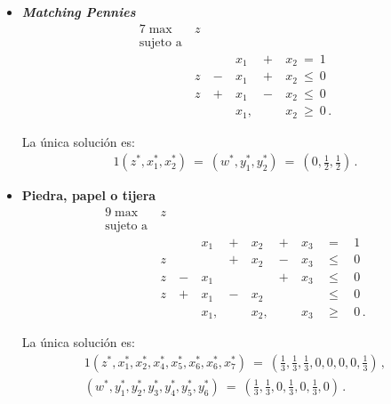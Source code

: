 \begin{itemize}

\item \textbf{\textit{Matching Pennies}}
\begin{alignat}{7}
\label{apex:eq:pl-matching-pennies}
\max\ & z & & & &\\ \nonumber
\text{sujeto a}\ & & & & &\\ \nonumber
    &    &    & x_1\ & +\ & x_2\  =\    1 \\ \nonumber
    & z\ & -\ & x_1\ & +\ & x_2\  \leq\ 0 \\ \nonumber
    & z\ & +\ & x_1\ & -\ & x_2\  \leq\ 0 \\ \nonumber
    &    &    & x_1, &    & x_2\ \geq\ 0 \,. \nonumber
\end{alignat}

La única solución es:
\begin{alignat}{1}
(z^*, x_1^*, x_2^*)\ =\ (w^*, y^*_1, y^*_2)\ =\ \left(0, \frac{1}{2}, \frac{1}{2} \right) \,.
\end{alignat}

\item \textbf{Piedra, papel o tijera}
\begin{alignat}{9}
\label{apex:eq:pl-RPS}
\max\  & z\ &  & & & & & \\ \nonumber
\text{sujeto a}\ & & & & & & & \\  \nonumber 
&    &    & x_1\ & +\ & x_2\ & +\ & x_3\ & \ =\     & \ 1 \\ \nonumber
& z\ &    &      & +\ & x_2\ & -\ & x_3\ & \ \leq\  & \ 0 \\ \nonumber
& z\ & -\ & x_1\ &    &      & +\ & x_3\ & \ \leq\  & \ 0 \\ \nonumber
& z\ & +\ & x_1\ & -\ & x_2\ &    &      & \ \leq\  & \ 0 \\ \nonumber
&    &    & x_1, &    & x_2, &    & x_3\ & \ \geq\  & \ 0  \,.  \nonumber
\end{alignat}

La única solución es:
\begin{alignat}{1}
(z^*, x^*_1, x^*_2, x^*_4, x^*_5, x^*_6, x^*_6, x^*_7)\ =\ \left(\frac{1}{3}, \frac{1}{3}, \frac{1}{3}, 0, 0, 0, 0, \frac{1}{3}\right) \,, \\
(w^*, y^*_1, y^*_2, y^*_3,  y^*_4, y^*_5, y^*_6)\ =\ \left(\frac{1}{3}, \frac{1}{3}, 0, \frac{1}{3}, 0, \frac{1}{3}, 0\right) \,.
\end{alignat}


\end{itemize}
